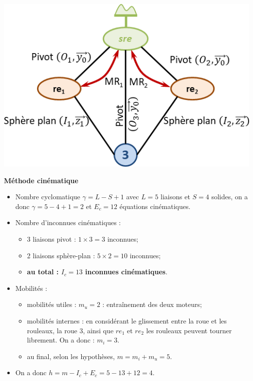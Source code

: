 \documentclass[10pt,fleqn]{article} %
\begin{document}
\begin{center}
\includegraphics[width=.7\linewidth]{images/fig_02}
\end{center}
\begin{multicols}{2}
\textbf{Méthode cinématique}
\begin{itemize}
\item Nombre cyclomatique $\gamma = L-S+1 $ avec $L=5$ liaisons et $S=4$ solides, on a donc $\gamma = 5-4+1=2$ et $E_c=12$ équations cinématiques.
\item Nombre d'inconnues cinématiques : 
\begin{itemize}
\item 3 liaisons pivot : $1\times 3=3$ inconnues;
\item 2 liaisons sphère-plan : $5\times 2=10$ inconnues;
\item \textbf{au total : $I_c=13$ inconnues cinématiques}.
\end{itemize}
\item Mobilités : 
\begin{itemize}
\item mobilités utiles : $m_u=2$ : entraînement des deux moteurs;
\item mobilités internes : en considérant le glissement entre la roue et les rouleaux, la roue 3, ainsi que $re_1$ et $re_2$ les rouleaux peuvent tourner librement. On a donc : $m_i =3$. %
\item au final, selon les hypothèses, $m=m_i+m_u=5$.
\end{itemize}
\item On a donc $h=m-I_c+E_c =5-13+12=4$.
\end{itemize}

\vfill\null
\columnbreak


\end{multicols}
\end{document}
